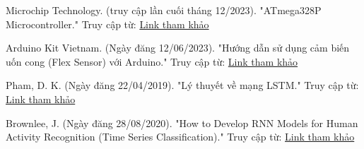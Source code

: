 \begin{thebibliography}{3}
    \item Microchip Technology. (truy cập lần cuối tháng 12/2023). "ATmega328P Microcontroller." Truy cập từ: \href{https://www.microchip.com/en-us/product/ATmega328P}{Link tham khảo} 
    \item Arduino Kit Vietnam. (Ngày đăng 12/06/2023). "Hướng dẫn sử dụng cảm biến uốn cong (Flex Sensor) với Arduino." Truy cập từ: \href{https://arduinokit.vn/huong-dan-su-dung-cam-bien-uon-cong-flex-sensor-voi-arduino/}{Link tham khảo} 
    \item Pham, D. K. (Ngày đăng 22/04/2019). "Lý thuyết về mạng LSTM." Truy cập từ: \href{https://phamdinhkhanh.github.io/2019/04/22/Ly_thuyet_ve_mang_LSTM.html?fbclid=IwAR0rBn2SL1vPNYmLgixLra-BoMMb6f98mhPrMxv_BhX13_9sK3_4da1vN6c}{Link tham khảo}
    \item Brownlee, J. (Ngày đăng 28/08/2020). "How to Develop RNN Models for Human Activity Recognition (Time Series Classification)." Truy cập từ: \href{https://machinelearningmastery.com/how-to-develop-rnn-models-for-human-activity-recognition-time-series-classification/}{Link tham khảo}  
    
\end{thebibliography}